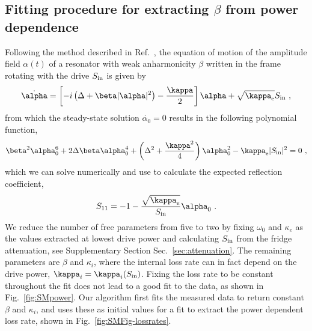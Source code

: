 \subsection{Fitting procedure for extracting $\beta$ from power dependence}\label{sec:SMduffing}

Following the method described in Ref.~\cite{schmidtCurrentDetectionUsing2020}, the equation of motion of the amplitude field $\alpha(t)$ of a resonator with weak anharmonicity $\beta$ written in the frame rotating with the drive $S_{\rm in}$ is given by
%
\begin{align}
\dot{\alpha} = \left[ -i \left( \Delta+\beta\abs{\alpha}^2 \right)-\frac{\kappa}{2} \right]\alpha + \sqrt{\kappa_\text{e}} S_\text{in}\ ,
\label{eq:Duffing-EOM}
\end{align}
%
from which the steady-state solution $\dot{\alpha_0}=0$ results in the following polynomial function,
% 
\begin{align}
\beta^2 \alpha_0^6 + 2\Delta\beta\alpha_0^4 + \left(\Delta^2+\frac{\kappa^2}{4}\right)\alpha_0^2 - \kappa_\text{e} \abs{S_{\rm in}}^2 = 0\ ,
\label{eq:polynom}
\end{align}
%
which we can solve numerically and use to calculate the expected reflection coefficient,
\begin{align}
S_{11}=-1-\frac{\sqrt{\kappa_e}}{S_{\rm in}}\alpha_0\ .
\label{eq:S11anh}
\end{align}
%
We reduce the number of free parameters from five to two by fixing $\omega_0$ and $\kappa_e$ as the values extracted at lowest drive power and calculating $S_{\rm in}$ from the fridge attenuation, see Supplementary Section Sec.~\ref{sec:attenuation}.
%
The remaining parameters are $\beta$ and $\kappa_i$, where the internal loss rate can in fact depend on the drive power, $\kappa_i=\kappa_i(S_{\rm in})$.
%
Fixing the loss rate to be constant throughout the fit does not lead to a good fit to the data, as shown in Fig.~\ref{fig:SMpower}.
%
Our algorithm first fits the measured data to return constant $\beta$ and $\kappa_i$, and uses these as initial values for a fit to extract the power dependent loss rate, shown in Fig.~\ref{fig:SMFig-lossrates}.

